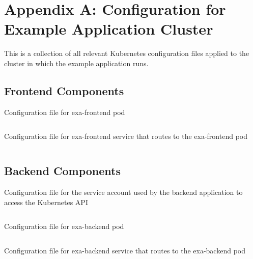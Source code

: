 \chapter*{Appendix A: Configuration for Example Application Cluster} \label{apx:A}

This is a collection of all relevant Kubernetes configuration files applied to the cluster in which the example application runs.

\section*{Frontend Components}

\begin{listing}[H]    
	\caption{Configuration file for exa-frontend pod}    
    \inputminted[autogobble, frame=single, linenos]{yaml}{yaml/exa-frontend/exa-frontend-pod.yaml}
    \label{lst:frontendPod}
\end{listing}  

\begin{listing}[H]    
	\caption{Configuration file for exa-frontend service that routes to the exa-frontend pod}  
	\inputminted[autogobble, frame=single, linenos]{yaml}{yaml/exa-frontend/exa-frontend-service.yaml}
    \label{lst:frontendService}
\end{listing}  


\section*{Backend Components}

\begin{listing}[H]    
	\caption{Configuration file for the service account used by the backend application to access the Kubernetes API}  
	\inputminted[autogobble, frame=single, linenos]{yaml}{yaml/exa-backend/exa-backend-sa.yaml}
	\label{lst:exa-backend-sa}  
\end{listing}  

\begin{listing}[H]    
	\caption{Configuration file for exa-backend pod}  
	\inputminted[autogobble, frame=single, linenos]{yaml}{yaml/exa-backend/exa-backend-pod.yaml}
	\label{lst:backendPod}
\end{listing}  

\begin{listing}[H]    
	\caption{Configuration file for exa-backend service that routes to the exa-backend pod} 
	\inputminted[autogobble, frame=single, linenos]{yaml}{yaml/exa-backend/exa-backend-service.yaml}
	\label{lst:backendService}
\end{listing}  

